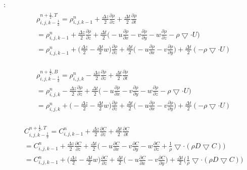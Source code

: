 \documentclass{article}
\numberwithin{equation}{subsection}
\begin{document}
:
\begin{align}
\begin{split}
& \rho_{i,j,k-\frac{1}{2}}^{n+\frac{1}{2},T} = \rho_{i,j,k-1}^n + \frac{\Delta z}{2} \frac{\partial \rho}{\partial z} + \frac{\Delta t}{2} \frac{\partial \rho}{\partial t} \\
& = \rho_{i,j,k-1}^{n} + \frac{\Delta z}{2} \frac{\partial \rho}{\partial z} + \frac{\Delta t}{2} \Big( -u\frac{\partial \rho}{\partial x} - v\frac{\partial \rho}{\partial y} - w\frac{\partial \rho}{\partial z} - \rho \bigtriangledown \cdot U \Big) \\
& = \rho_{i,j,k-1}^{n} + \big( \frac{\Delta z}{2} - \frac{\Delta t}{2}w\big)\frac{\partial \rho}{\partial z} + \frac{\Delta t}{2} \big( - u\frac{\partial \rho}{\partial x} - v\frac{\partial \rho}{\partial y} \big) + \frac{\Delta t}{2} (-\rho \bigtriangledown \cdot U)
\end{split}
\end{align}

\begin{align}
\begin{split}
& \rho_{i,j,k-\frac{1}{2}}^{n+\frac{1}{2},B} = \rho_{i,j,k}^n - \frac{\Delta z}{2} \frac{\partial \rho}{\partial z} + \frac{\Delta t}{2} \frac{\partial \rho}{\partial t} \\
& = \rho_{i,j,k}^{n} - \frac{\Delta z}{2} \frac{\partial \rho}{\partial z} + \frac{\Delta t}{2} \Big( -u\frac{\partial \rho}{\partial x} - v\frac{\partial \rho}{\partial y} - w\frac{\partial \rho}{\partial z} - \rho \bigtriangledown \cdot U \Big) \\
& = \rho_{i,j,k}^{n} + \big( -\frac{\Delta z}{2} - \frac{\Delta t}{2}w\big)\frac{\partial \rho}{\partial z} + \frac{\Delta t}{2} \big( - u\frac{\partial \rho}{\partial x} - v\frac{\partial \rho}{\partial y} \big) + \frac{\Delta t}{2} (-\rho \bigtriangledown \cdot U)
\end{split}
\end{align}

\begin{align}
\begin{split}
& C_{i,j,k-\frac{1}{2}}^{n+\frac{1}{2},T} = C_{i,j,k-1}^n + \frac{\Delta z}{2} \frac{\partial C}{\partial z} + \frac{\Delta t}{2} \frac{\partial C}{\partial t} \\
& = C_{i,j,k-1}^{n} + \frac{\Delta z}{2} \frac{\partial C}{\partial z} + \frac{\Delta t}{2} \Big( -u\frac{\partial C}{\partial x} - v\frac{\partial C}{\partial y} - w\frac{\partial C}{\partial z} + \frac{1}{\rho} \bigtriangledown \cdot( \rho D \bigtriangledown C) \Big) \\
& = C_{i,j,k-1}^{n} + \Big( \frac{\Delta z}{2} - \frac{\Delta t}{2}w\Big)\frac{\partial C}{\partial z} + \frac{\Delta t}{2} \Big( -u\frac{\partial C}{\partial x} -v\frac{\partial C}{\partial y} \big) + \frac{\Delta t}{2} \Big( \frac{1}{\rho} \bigtriangledown \cdot( \rho D \bigtriangledown C)\Big)
\end{split}
\end{align}
\end{document}
